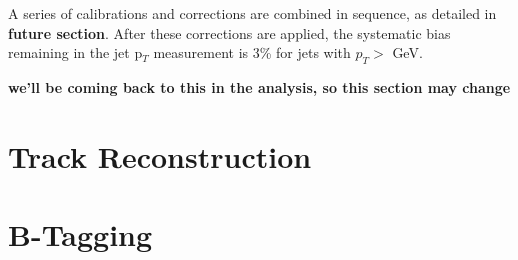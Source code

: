 A series of calibrations and corrections are combined in sequence, as detailed in \textbf{future section}.  After these corrections are applied, the systematic bias remaining in the jet p$_T$ measurement is 3\% for jets with $p_T>$ GeV.

\textbf{we'll be coming back to this in the analysis, so this section may change}

\section{Track Reconstruction}


\section{B-Tagging}

